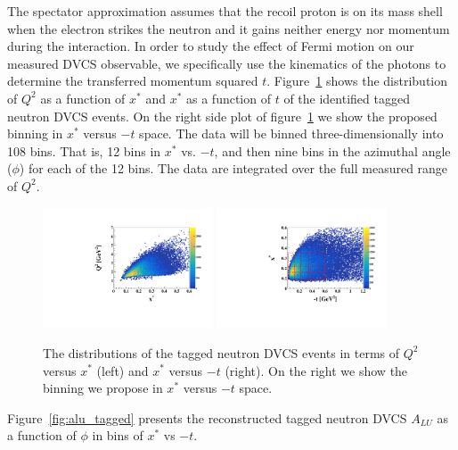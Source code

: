 The spectator approximation assumes that the recoil proton is on its mass shell 
when the electron strikes the neutron and it gains neither energy nor momentum 
during the interaction. In order to study the effect of Fermi motion on our 
measured DVCS observable, we specifically use the kinematics of the photons to 
determine the transferred momentum squared $t$.  Figure~\ref{fig:binning_x_t} 
shows the distribution of $Q^2$ as a function of $x^*$ and $x^*$ as a function 
of $t$ of the identified tagged neutron DVCS events. On the right side plot of 
figure~\ref{fig:binning_x_t} we show the proposed binning in $x^{*}$ versus 
$-t$ space. The data will be binned three-dimensionally into 108 bins. That is, 
12 bins in $x^{*}$ vs. $-t$, and then nine bins in the azimuthal angle ($\phi$) 
for each of the 12 bins. The data are integrated over the full measured range 
of $Q^2$.   
   

\begin{figure}[htb]
  \centering
    \includegraphics[width=0.45\textwidth,clip]{figs/pdf/Q2_x*.pdf}
    \includegraphics[width=0.45\textwidth,clip]{figs/pdf/t_x*.pdf}
   \caption{The distributions of the tagged neutron DVCS events in terms of 
   $Q^2$ versus $x^*$ (left) and  $x^{*}$ versus $-t$ (right). On the right we 
   show the binning we propose in $x^{*}$ versus $-t$ space.
   \label{fig:binning_x_t}}
\end{figure}


Figure~\ref{fig:alu_tagged} presents the reconstructed tagged neutron DVCS  
$A_{LU}$ as a function of $\phi$ in bins of $x^{*}$ vs $-t$.  

